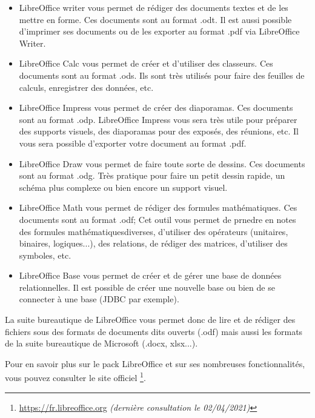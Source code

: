 \documentclass[12pt]{book}
\begin{document}
		\begin{itemize}
			\item LibreOffice writer vous permet de rédiger des documents textes et de les mettre en forme.
			Ces documents sont au format .odt. 
			Il est aussi possible d'imprimer ses documents ou de les exporter au format .pdf via LibreOffice Writer.
			\item LibreOffice Calc vous permet de créer et d'utiliser des classeurs.
			Ces documents sont au format .ods. 
			Ils sont très utilisés pour faire des feuilles de calculs, enregistrer des données, etc.
			\item LibreOffice Impress vous permet de créer des diaporamas. 
			Ces documents sont au format .odp.
			LibreOffice Impress vous sera très utile pour préparer des supports visuels, des diaporamas pour des exposés, des réunions, etc.
			Il vous sera possible d'exporter votre document au format .pdf.
			\item LibreOffice Draw vous permet de faire toute sorte de dessins.
			Ces documents sont au format .odg.
			Très pratique pour faire un petit dessin rapide, un schéma plus complexe ou bien encore un support visuel.
			\item LibreOffice Math vous permet de rédiger des formules mathématiques.
			Ces documents sont au format .odf;
			Cet outil vous permet de prnedre en notes des formules mathématiquesdiverses, d'utiliser des opérateurs (unitaires, binaires, logiques...), des relations, de rédiger des matrices, d'utiliser des symboles, etc.
			\item LibreOffice Base vous permet de créer et de gérer une base de données relationnelles.
			Il est possible de créer une nouvelle base ou bien de se connecter à une base (JDBC par exemple). 
		\end{itemize}\par
		La suite bureautique de LibreOffice vous permet donc de lire et de rédiger des fichiers sous des formats de documents dits ouverts (.odf) mais aussi les formats de la suite bureautique de Microsoft (.docx, xlsx...).\par
		Pour en savoir plus sur le pack LibreOffice et sur ses nombreuses fonctionnalités, vous pouvez consulter le site officiel \footnote{
		\href{https://fr.libreoffice.org}{https://fr.libreoffice.org} \textit{(dernière consultation le 02/04/2021)}}.
\end{document}
